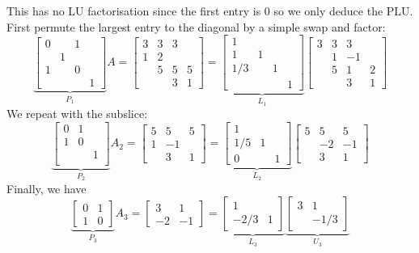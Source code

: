 \documentclass[12pt,a4paper]{article}
\begin{document}
This has no LU factorisation since the first entry is 0 so we only deduce the PLU. First permute the largest entry to the diagonal by a simple swap and factor:
\[
\underbrace{\begin{bmatrix}
0 &  & 1 \\
 & 1 \\
 1 & & 0 \\
 &&& 1
\end{bmatrix}}_{P_1} A = \begin{bmatrix} 3 & 3 &3 \\
1 & 2 \\
 & 5  & 5 & 5 \\
 && 3 & 1 
 \end{bmatrix} = 
  \underbrace{\begin{bmatrix} 1 &  & \\
1 & 1 \\
1/3 &   &  1 \\
 &&  & 1 
 \end{bmatrix}}_{L_1}
  \begin{bmatrix} 3 & 3 &3 \\
 & 1 & -1 \\
 & 5  & 1 & 2 \\
 && 3 & 1 
 \end{bmatrix}
\]
We repeat with the subslice:
\[
\underbrace{\begin{bmatrix}
0 & 1 &  \\
1 & 0 \\
  & & 1 \\
\end{bmatrix}}_{P_2}  A_2 =
  \begin{bmatrix} 
  5  & 5 & 5 \\
  1 & -1 \\
 & 3 & 1 
 \end{bmatrix} = 
   \underbrace{\begin{bmatrix} 
  1  &  &  \\
  1/5 & 1 \\
0 &  & 1 
 \end{bmatrix}}_{L_2}   \begin{bmatrix} 
  5  & 5 & 5 \\
   & -2 & -1 \\
 & 3 & 1 
 \end{bmatrix}
\]
Finally, we have
\[
\underbrace{\begin{bmatrix}
0 & 1   \\
1 & 0 
\end{bmatrix}}_{P_3}  A_3 = \begin{bmatrix}3 & 1 \\ -2 & -1 \end{bmatrix}
= \underbrace{\begin{bmatrix}1 &  \\ -2/3 & 1 \end{bmatrix}}_{L_3}
\underbrace{\begin{bmatrix}3 & 1 \\  & -1/3 \end{bmatrix}}_{U_3}
\]
\end{document}
